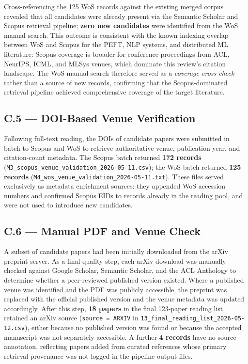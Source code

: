 Cross-referencing the 125 WoS records against the existing merged corpus revealed that
all candidates were already present via the Semantic Scholar and Scopus retrieval
pipeline; \textbf{zero new candidates} were identified from the WoS manual search.
This outcome is consistent with the known indexing overlap between WoS and Scopus for
the PEFT, NLP systems, and distributed ML literature: Scopus coverage is broader for
conference proceedings from ACL, NeurIPS, ICML, and MLSys venues, which dominate this
review's citation landscape. The WoS manual search therefore served as a \textit{coverage
cross-check} rather than a source of new records, confirming that the Scopus-dominated
retrieval pipeline achieved comprehensive coverage of the target literature.

\subsection*{C.5 — DOI-Based Venue Verification}
\label{app:search_log:doi}

Following full-text reading, the DOIs of candidate papers were submitted in batch to
Scopus and WoS to retrieve authoritative venue, publication year, and citation-count
metadata. The Scopus batch returned \textbf{172 records}
(\texttt{M3\_scopus\_venue\_validation\_2026-05-11.csv}); the WoS batch returned
\textbf{125 records} (\texttt{M4\_wos\_venue\_validation\_2026-05-11.txt}). These
files served exclusively as metadata enrichment sources: they appended WoS accession
numbers and confirmed Scopus EIDs to records already in the reading pool, and were not
used to introduce new candidates.

\subsection*{C.6 — Manual PDF and Venue Check}
\label{app:search_log:pdf}

A subset of candidate papers had been initially downloaded from the arXiv preprint
server. As a final quality step, each arXiv download was manually checked against
Google Scholar, Semantic Scholar, and the ACL Anthology to determine whether a
peer-reviewed published version existed. Where a published venue was identified and
the PDF was publicly accessible, the preprint was replaced with the official published
version and the venue metadata was updated accordingly. After this step,
\textbf{18 papers} in the final 123-paper reading list retained an arXiv source
(\texttt{source = ARXIV} in \texttt{13\_final\_reading\_list\_2026-05-12.csv}),
either because no published version was found or because the accepted manuscript was
not separately accessible. A further \textbf{4 records} have no source annotation,
reflecting papers added from curated references whose primary retrieval provenance was
not logged in the pipeline output files.
